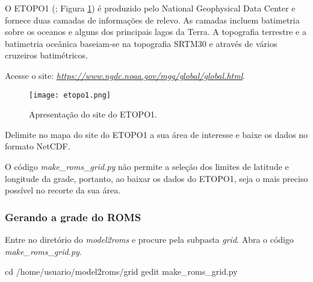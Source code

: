 \noindent O ETOPO1 (\cite{Amante2009}; Figura \textcolor{bleu_cite}{\ref{etopo1}}) é produzido pelo National Geophysical Data Center e fornece duas camadas de informações de relevo. As camadas incluem batimetria sobre os oceanos e alguns dos principais lagos da Terra. A topografia terrestre e a batimetria oceânica baseiam-se na topografia SRTM30 e através de vários cruzeiros batimétricos. 
\bigskip

\noindent Acesse o site: \textcolor{bleu_cite}{\href{https://www.ngdc.noaa.gov/mgg/global/global.html}{\textit{https://www.ngdc.noaa.gov/mgg/global/global.html}}}.
\bigskip
   
\begin{figure}[H]
    \centering
    \captionsetup{justification=centering}
    \texttt{[image: etopo1.png]}
    \caption{Apresentação do site do ETOPO1.}
    \label{etopo1}
\end{figure}
\bigskip

\noindent Delimite no mapa do site do ETOPO1 a sua área de interesse e baixe os dados no formato NetCDF. 
\bigskip

\begin{tcolorbox}[enhanced,
    grow to left by   = 0cm,
    grow to right by  = 0cm,
    enlarge top by    = 0cm,
    enlarge bottom by = 0cm,
    tcbox raise base,
    boxrule           = 1.0pt,
    left              = 18mm,
    colframe          = red!50!black,coltext=red!25!black,colback=red!10!white,
    overlay           = {\begin{tcbclipinterior}\fill[red!75!blue!50!white] (frame.south west)
      rectangle node[text=white,font=\sffamily\bfseries\footnotesize,rotate=0] {ATENÇÃO} ([xshift=18mm]frame.north west);\end{tcbclipinterior}}]
  O código \textit{make\_roms\_grid.py} não permite a seleção dos limites de latitude e longitude da grade, portanto, ao baixar os dados do ETOPO1, seja o mais preciso possível no recorte da sua área.
\end{tcolorbox}
\bigskip

\subsubsection{Gerando a grade do ROMS}

\noindent Entre no diretório do \textit{model2roms} e procure pela subpasta \textit{grid}. Abra o código \textit{make\_roms\_grid.py}.
\bigskip

\begin{bashcode}
cd /home/usuario/model2roms/grid
gedit make_roms_grid.py
\end{bashcode}
\bigskip

